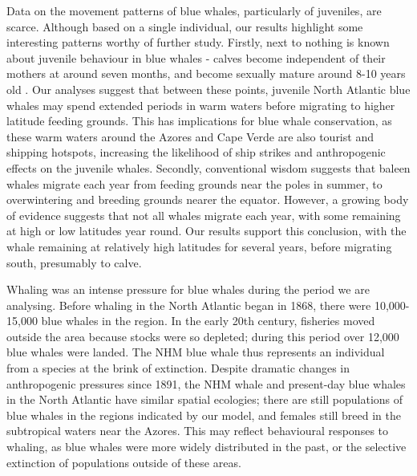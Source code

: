 \documentclass[a4paper,12pt]{article}
\begin{document}



Data on the movement patterns of blue whales, particularly of juveniles, are scarce. 
Although based on a single individual, our results highlight some interesting patterns worthy of further study.
Firstly, next to nothing is known about juvenile behaviour in blue whales - calves become independent of their mothers at around seven months, and become sexually mature around 8-10 years old \cite{handbook}.
Our analyses suggest that between these points, juvenile North Atlantic blue whales may spend extended periods in warm waters before migrating to higher latitude feeding grounds.
This has implications for blue whale conservation, as these warm waters around the Azores and Cape Verde are also tourist and shipping hotspots, increasing the likelihood of ship strikes and anthropogenic effects on the juvenile whales.
Secondly, conventional wisdom suggests that baleen whales migrate each year from feeding grounds near the poles in summer, to overwintering and breeding grounds nearer the equator\cite{corkeron1999baleen,lockyer1981migration}. 
However, a growing body of evidence suggests that not all whales migrate each year, with some remaining at high or low latitudes year round\cite{mcdonald2006biogeographic,busquets2017estimating}. 
Our results support this conclusion, with the whale remaining at relatively high latitudes for several years, before migrating south, presumably to calve.

Whaling was an intense pressure for blue whales during the period we are analysing. 
Before whaling in the North Atlantic began in 1868\cite{reilly2008balaenoptera}, there were 10,000-15,000 blue whales in the region\cite{sigurjonsson1995life}. 
In the early 20th century, fisheries moved outside the area because stocks were so depleted\cite{reilly2008balaenoptera}; during this period over 12,000 blue whales were landed\cite{sigurjonsson1995life}. 
The NHM blue whale thus represents an individual from a species at the brink of extinction.
Despite dramatic changes in anthropogenic pressures since 1891, the NHM whale and present-day blue whales in the North Atlantic have similar spatial ecologies; there are still populations of blue whales in the regions indicated by our model, and females still breed in the subtropical waters near the Azores\cite{reilly2008balaenoptera}. 
This may reflect behavioural responses to whaling, as blue whales were more widely distributed in the past\cite{reeves2004historical}, or the selective extinction of populations outside of these areas.
\end{document}
